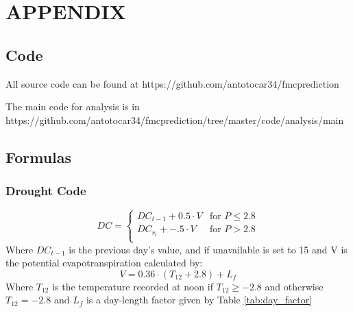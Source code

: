 \documentclass[twocolumn,10pt]{article}
\begin{document}
\onecolumn
\section{APPENDIX}
\subsection{Code}
All source code can be found at https://github.com/antotocar34/fmc\textunderscore prediction

The main code for analysis is in https://github.com/antotocar34/fmc\textunderscore prediction/tree/master/code/analysis/main

\subsection{Formulas}
\subsubsection*{Drought Code}
\begin{equation}
\label{eqn:dc1}
    DC =
    \begin{cases}
        DC_{t-1} + 0.5 \cdot V & \text{for $P \leq 2.8$} \\
        DC_{r_{t}} + -.5 \cdot V & \text{for $P > 2.8$} \\
    \end{cases}
\end{equation}
Where $DC_{t-1}$ is the previous day's value, and if unavailable is set to 15 and V is the potential evapotranspiration calculated by:
\begin{equation}
\label{eqn:dc2}
    V = 0.36 \cdot (T_{12} + 2.8) + L_{f}
\end{equation}
Where $T_{12}$ is the temperature recorded at noon if $T_{12} \geq -2.8$ and otherwise $T_{12} = -2.8$ and $L_{f}$ is a day-length factor given by Table \ref{tab:day_factor} \\
\end{document}
